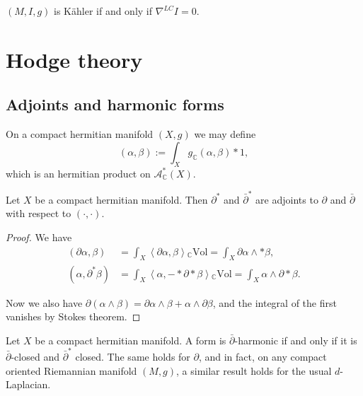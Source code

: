 \begin{exercise}
\label{exercise-kahler-iff-i-parallel}
$(M,I,g)$ is Kähler if and only if
$\nabla^{LC}I=0$.
\end{exercise}





\section{Hodge theory}
\label{section-hodge-theory}

\subsection{Adjoints and harmonic forms}
\label{subsection-harmonic-forms}

\noindent
On a compact hermitian manifold $(X,g)$ we
may define
$$
(\alpha,\beta):=\int_Xg_{\mathbb{C}}(\alpha,
\beta)*1,
$$
which is an hermitian product on
$\mathcal{A}_{\mathbb{C}}^*(X)$.

\begin{lemma}
\label{lemma-adjoints}
\begin{reference}
\cite[Lemma 3.2.3]{huc}
\end{reference}
Let $X$ be a compact hermitian manifold.
Then $\partial^*$ and $\bar\partial^*$
are adjoints to $\partial$ and $\bar\partial$
with respect to
$(\cdot,\cdot)$.
\end{lemma}

\begin{proof}
We have
$$
\begin{aligned}
(\partial\alpha,\beta)
&=\int_X\left\langle{}\partial\alpha,
\beta\right\rangle{}_\mathbb{C}\text{Vol}
=\int_X \partial\alpha\wedge*\beta,\\
(\alpha,\partial^*\beta)
&=\int_X\left\langle{}\alpha,-
*\partial*\beta\right\rangle{}_{\mathbb{C}}\text{Vol}
=\int_X\alpha\wedge\partial*\beta.
\end{aligned}
$$

\noindent
Now we also have
$\partial(\alpha\wedge\beta)
=\partial\alpha\wedge\beta+
\alpha\wedge\partial\beta$,
and the integral of the first vanishes by
Stokes theorem.
\end{proof}

\begin{lemma}
\label{lemma-harmonic-iff-closed}
Let $X$ be a compact hermitian manifold.
A form is $\bar\partial$-harmonic if and only
if
it is $\bar\partial$-closed and
$\bar\partial^*$ closed.
The same holds for $\partial$,
and in fact, on any compact oriented
Riemannian manifold $(M,g)$,
a similar result holds for the usual
$d$-Laplacian.
\end{lemma}

